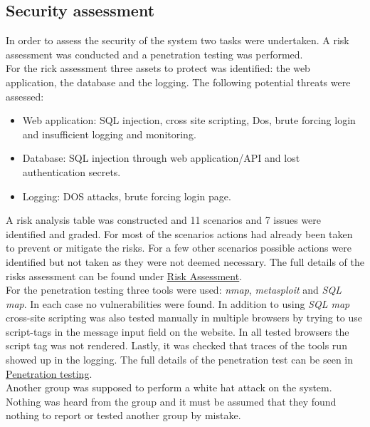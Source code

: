 \subsection{Security assessment} %
In order to assess the security of the system two tasks were undertaken. A risk assessment was conducted and a penetration testing was performed.\\
For the rick assessment three assets to protect was identified: the web application, the database and the logging. The following potential threats were assessed:
\begin{itemize}
    \item Web application: SQL injection, cross site scripting, Dos, brute forcing login and insufficient logging and monitoring.
    \item Database: SQL injection through web application/API and lost authentication secrets.
    \item Logging: DOS attacks, brute forcing login page.
\end{itemize}

A risk analysis table was constructed and 11 scenarios and 7 issues were identified and graded. For most of the scenarios actions had already been taken to prevent or mitigate the risks. For a few other scenarios possible actions were identified but not taken as they were not deemed necessary. The full details of the risks assessment can be found under \underline{\href{https://github.com/DevOps2021-gb/devops2021/wiki/Risk-assesment}{Risk Assessment}}.\\

For the penetration testing three tools were used: \textit{nmap}, \textit{metasploit} and \textit{SQL map}. In each case no vulnerabilities were found. In addition to using \textit{SQL map} cross-site scripting was also tested manually in multiple browsers by trying to use script-tags in the message input field on the website. In all tested browsers the script tag was not rendered. Lastly, it was checked that traces of the tools run showed up in the logging. The full details of the penetration test can be seen in \underline{\href{https://github.com/DevOps2021-gb/devops2021/wiki/Penetration-testing}{Penetration testing}}. \\

Another group was supposed to perform a white hat attack on the system. Nothing was heard from the group and it must be assumed that they found nothing to report or tested another group by mistake.

